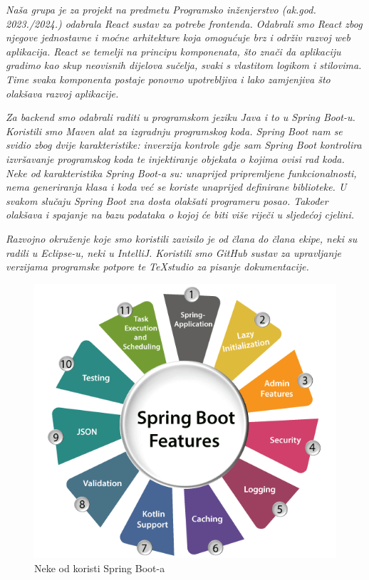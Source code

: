     \textit{Naša grupa je za projekt na predmetu Programsko inženjerstvo (ak.god. 2023./2024.) odabrala React sustav za potrebe frontenda. Odabrali smo React zbog njegove jednostavne i moćne arhitekture koja omogućuje brz i održiv razvoj web aplikacija. React se temelji na principu komponenata, što znači da aplikaciju gradimo kao skup neovisnih dijelova sučelja, svaki s vlastitom logikom i stilovima. Time svaka komponenta postaje ponovno upotrebljiva i lako zamjenjiva što olakšava razvoj aplikacije.}
    
    \textit{Za backend smo odabrali raditi u programskom jeziku Java i to u Spring Boot-u. Koristili smo Maven alat za izgradnju programskog koda. Spring Boot nam se svidio zbog dvije karakteristike: inverzija kontrole gdje sam Spring Boot kontrolira izvršavanje programskog koda te injektiranje objekata o kojima ovisi rad koda. Neke od karakteristika Spring Boot-a su: unaprijed pripremljene funkcionalnosti, nema generiranja klasa i koda već se koriste unaprijed definirane biblioteke. U svakom slučaju Spring Boot zna dosta olakšati programeru posao. Također olakšava i spajanje na bazu podataka o kojoj će biti više riječi u sljedećoj cjelini.}
    
    \textit{Razvojno okruženje koje smo koristili zavisilo je od člana do člana ekipe, neki su radili u Eclipse-u, neki u IntelliJ. Koristili smo GitHub sustav za upravljanje verzijama programske potpore te TeXstudio za pisanje dokumentacije.}
    
    \begin{figure}[H]
    	\includegraphics[scale=0.5]{slike/SpringBoot.PNG} %
    	\centering
    	\caption{Neke od koristi Spring Boot-a}
    	\label{fig:promjene}
    \end{figure}
		

